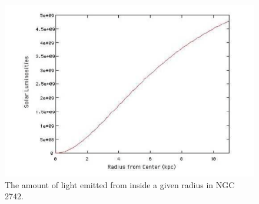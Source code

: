 \documentclass[11pt]{article}%
\begin{document}
\begin{figure}[h!]
\center
\includegraphics[scale=0.6]{enclosed_luminosity.png}
\caption{The amount of light emitted from inside a given radius in NGC 2742.}
\label{luminosity}
\end{figure}
\end{document}
